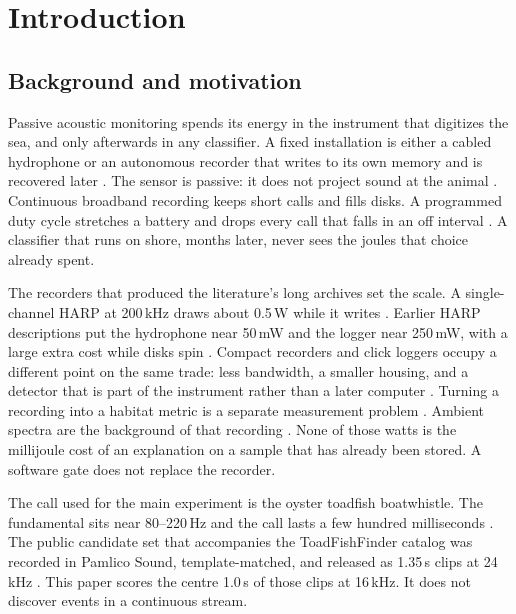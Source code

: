 \documentclass[sn-mathphys-num]{sn-jnl}%
\theoremstyle{thmstyleone}%
\theoremstyle{thmstyletwo}%
\theoremstyle{thmstylethree}%
\begin{document}
\section{Introduction}\label{sec:intro}

\subsection{Background and motivation}\label{sec:background}

Passive acoustic monitoring spends its energy in the instrument that digitizes the sea, and only afterwards in any classifier. A fixed installation is either a cabled hydrophone or an autonomous recorder that writes to its own memory and is recovered later \cite{mellinger2007,sousalima2013}. The sensor is passive: it does not project sound at the animal \cite{zimmer2011}. Continuous broadband recording keeps short calls and fills disks. A programmed duty cycle stretches a battery and drops every call that falls in an off interval \cite{wiggins2007,wiggins2023}. A classifier that runs on shore, months later, never sees the joules that choice already spent.

The recorders that produced the literature's long archives set the scale. A single-channel HARP at 200\,kHz draws about 0.5\,W while it writes \cite{wiggins2023}. Earlier HARP descriptions put the hydrophone near 50\,mW and the logger near 250\,mW, with a large extra cost while disks spin \cite{wiggins2007}. Compact recorders and click loggers occupy a different point on the same trade: less bandwidth, a smaller housing, and a detector that is part of the instrument rather than a later computer \cite{taylor2024,todd2023,ivanchikova2023}. Turning a recording into a habitat metric is a separate measurement problem \cite{merchant2015}. Ambient spectra are the background of that recording \cite{knudsen1948,wenz1962,hildebrand2009}. None of those watts is the millijoule cost of an explanation on a sample that has already been stored. A software gate does not replace the recorder.

The call used for the main experiment is the oyster toadfish boatwhistle. The fundamental sits near 80--220\,Hz and the call lasts a few hundred milliseconds \cite{gray1961,fine1978,elemans2014,mensinger2014}. The public candidate set that accompanies the ToadFishFinder catalog was recorded in Pamlico Sound, template-matched, and released as 1.35\,s clips at 24\,kHz \cite{bohnenstiehl2023,bohnenstiehl2023data}. This paper scores the centre 1.0\,s of those clips at 16\,kHz. It does not discover events in a continuous stream.
\end{document}
